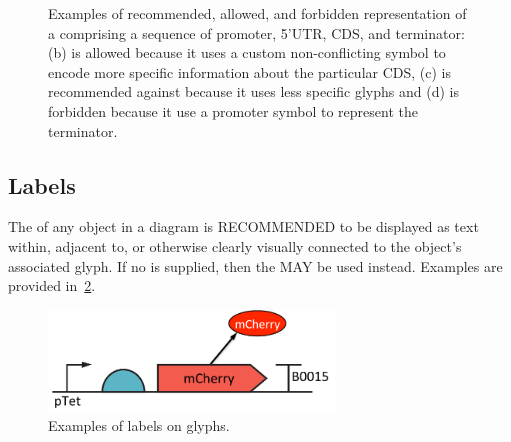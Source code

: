 \begin{enumerate}
	\begin{figure}[h!]
	\centering
	\caption{Examples of recommended, allowed, and forbidden representation of a  comprising a sequence of promoter, 5'UTR, CDS, and terminator: (b) is allowed because it uses a custom non-conflicting symbol to encode more specific information about the particular CDS, (c) is recommended against because it uses less specific glyphs and (d) is forbidden because it use a promoter symbol to represent the terminator.}
	\label{exa:2f}
	\end{figure}
\end{enumerate}
	
	
\subsection{Labels}
The  of any object in a diagram is RECOMMENDED to be displayed as text within, adjacent to, or otherwise clearly visually connected to the object's associated glyph.  If no  is supplied, then the  MAY be used instead.
Examples are provided in~\ref{exa:5}.

	\begin{figure}[h!]
	\centering
	\includegraphics[width=3in]{figures/examples/5-labels.pdf}
	\caption{Examples of labels on glyphs.}
	\label{exa:5}
	\end{figure}


